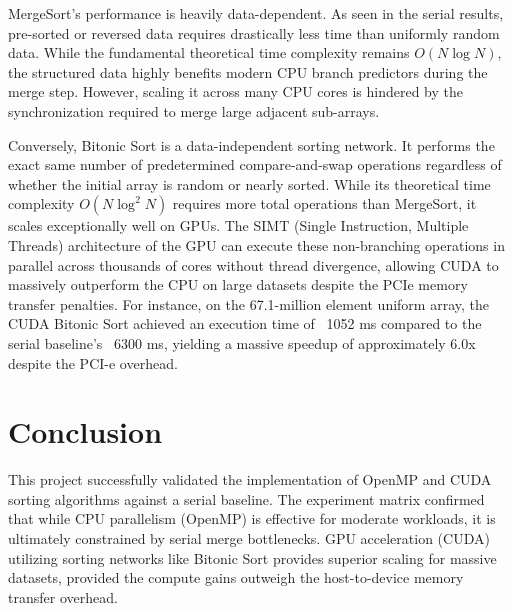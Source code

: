 \documentclass[12pt, a4paper]{article}
\begin{document}
MergeSort's performance is heavily data-dependent. As seen in the serial results, pre-sorted or reversed data requires drastically less time than uniformly random data. While the fundamental theoretical time complexity remains $O(N \log N)$, the structured data highly benefits modern CPU branch predictors during the merge step. However, scaling it across many CPU cores is hindered by the synchronization required to merge large adjacent sub-arrays.

Conversely, Bitonic Sort is a data-independent sorting network. It performs the exact same number of predetermined compare-and-swap operations regardless of whether the initial array is random or nearly sorted. While its theoretical time complexity $O(N \log^2 N)$ requires more total operations than MergeSort, it scales exceptionally well on GPUs. The SIMT (Single Instruction, Multiple Threads) architecture of the GPU can execute these non-branching operations in parallel across thousands of cores without thread divergence, allowing CUDA to massively outperform the CPU on large datasets despite the PCIe memory transfer penalties. For instance, on the 67.1-million element uniform array, the CUDA Bitonic Sort achieved an execution time of ~1052 ms compared to the serial baseline's ~6300 ms, yielding a massive speedup of approximately 6.0x despite the PCI-e overhead.

\section{Conclusion}
This project successfully validated the implementation of OpenMP and CUDA sorting algorithms against a serial baseline. The experiment matrix confirmed that while CPU parallelism (OpenMP) is effective for moderate workloads, it is ultimately constrained by serial merge bottlenecks. GPU acceleration (CUDA) utilizing sorting networks like Bitonic Sort provides superior scaling for massive datasets, provided the compute gains outweigh the host-to-device memory transfer overhead.


\end{document}
